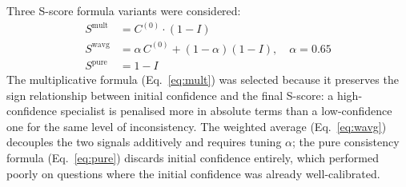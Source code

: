 \documentclass[10pt]{article}
\begin{document}
Three S-score formula variants were considered:
\begin{align}
S^{\text{mult}} &= C^{(0)} \cdot (1 - I) \label{eq:mult} \\
S^{\text{wavg}} &= \alpha \, C^{(0)} + (1-\alpha)(1-I),\quad \alpha=0.65 \label{eq:wavg}\\
S^{\text{pure}} &= 1 - I \label{eq:pure}
\end{align}
The multiplicative formula (Eq.~\ref{eq:mult}) was selected because it
preserves the sign relationship between initial confidence and the final
S-score: a high-confidence specialist is penalised more in absolute terms
than a low-confidence one for the same level of inconsistency.  The weighted
average (Eq.~\ref{eq:wavg}) decouples the two signals additively and requires
tuning $\alpha$; the pure consistency formula (Eq.~\ref{eq:pure}) discards
initial confidence entirely, which performed poorly on questions where
the initial confidence was already well-calibrated.
\end{document}

